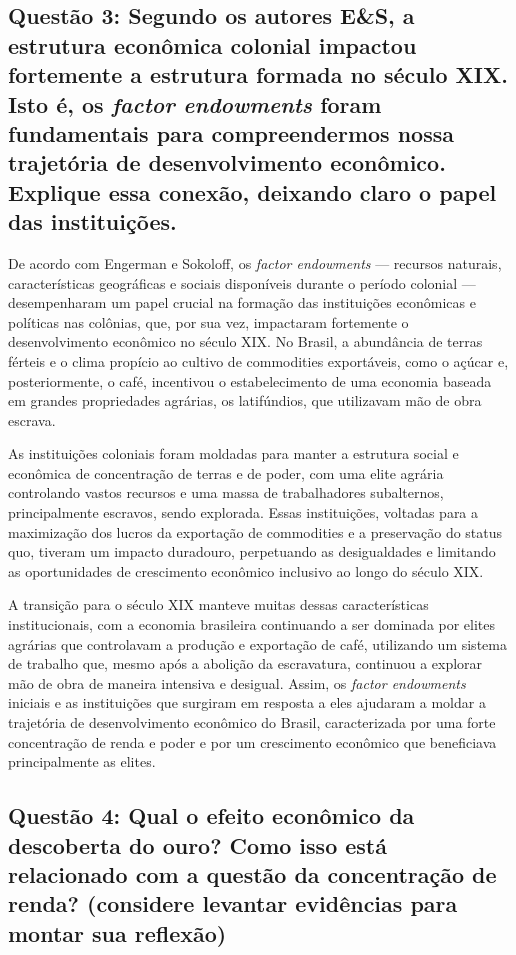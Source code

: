 \documentclass[a4paper,12pt]{article}[abntex2]
\begin{document}
\subsection{\textbf{Questão 3: Segundo os autores E\&S, a estrutura econômica colonial impactou fortemente a estrutura formada no século XIX. Isto é, os \textit{factor endowments} foram fundamentais para compreendermos nossa trajetória de desenvolvimento econômico. Explique essa conexão, deixando claro o papel das instituições.}}

De acordo com Engerman e Sokoloff, os \textit{factor endowments} — recursos naturais, características geográficas e sociais disponíveis durante o período colonial — desempenharam um papel crucial na formação das instituições econômicas e políticas nas colônias, que, por sua vez, impactaram fortemente o desenvolvimento econômico no século XIX. No Brasil, a abundância de terras férteis e o clima propício ao cultivo de commodities exportáveis, como o açúcar e, posteriormente, o café, incentivou o estabelecimento de uma economia baseada em grandes propriedades agrárias, os latifúndios, que utilizavam mão de obra escrava.

As instituições coloniais foram moldadas para manter a estrutura social e econômica de concentração de terras e de poder, com uma elite agrária controlando vastos recursos e uma massa de trabalhadores subalternos, principalmente escravos, sendo explorada. Essas instituições, voltadas para a maximização dos lucros da exportação de commodities e a preservação do status quo, tiveram um impacto duradouro, perpetuando as desigualdades e limitando as oportunidades de crescimento econômico inclusivo ao longo do século XIX.

A transição para o século XIX manteve muitas dessas características institucionais, com a economia brasileira continuando a ser dominada por elites agrárias que controlavam a produção e exportação de café, utilizando um sistema de trabalho que, mesmo após a abolição da escravatura, continuou a explorar mão de obra de maneira intensiva e desigual. Assim, os \textit{factor endowments} iniciais e as instituições que surgiram em resposta a eles ajudaram a moldar a trajetória de desenvolvimento econômico do Brasil, caracterizada por uma forte concentração de renda e poder e por um crescimento econômico que beneficiava principalmente as elites.

\subsection{\textbf{Questão 4: Qual o efeito econômico da descoberta do ouro? Como isso está relacionado com a questão da concentração de renda? (considere levantar evidências para montar sua reflexão)}}
\end{document}
